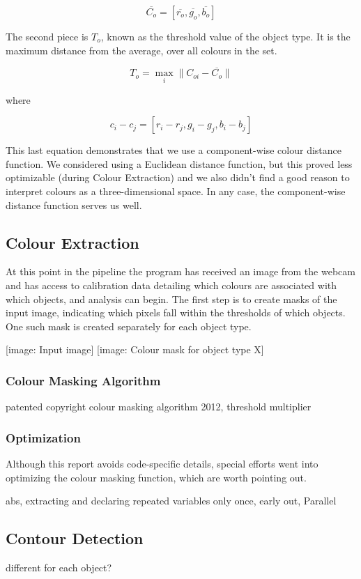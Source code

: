 \documentclass[10pt,twocolumn]{article}
\begin{document}
\[
\overline{C_o} = [ \overline{r_o},\overline{g_o},\overline{b_o} ]
\]

The second piece is $T_o$, known as the threshold value of the object type. It is the maximum distance from the average, over all colours in the set.

\[
T_o = \max_{i} \lVert C_{oi} - \overline{C_o} \rVert
\]

where

\[
c_i - c_j = [r_{i}-r_{j},g_{i}-g_{j},b_{i}-b_{j}]
\]

This last equation demonstrates that we use a component-wise colour distance function. We considered using a Euclidean distance function, but this proved less optimizable (during Colour Extraction) and we also didn't find a good reason to interpret colours as a three-dimensional space. In any case, the component-wise distance function serves us well.

\subsection{Colour Extraction}
At this point in the pipeline the program has received an image from the webcam and has access to calibration data detailing which colours are associated with which objects, and analysis can begin. The first step is to create masks of the input image, indicating which pixels fall within the thresholds of which objects. One such mask is created separately for each object type.

[image: Input image] [image: Colour mask for object type X]

\subsubsection{Colour Masking Algorithm}
patented copyright colour masking algorithm 2012, threshold multiplier

\subsubsection{Optimization}
Although this report avoids code-specific details, special efforts went into optimizing the colour masking function, which are worth pointing out.

abs, extracting and declaring repeated variables only once, early out, Parallel

\subsection{Contour Detection}
different for each object?
\end{document}
